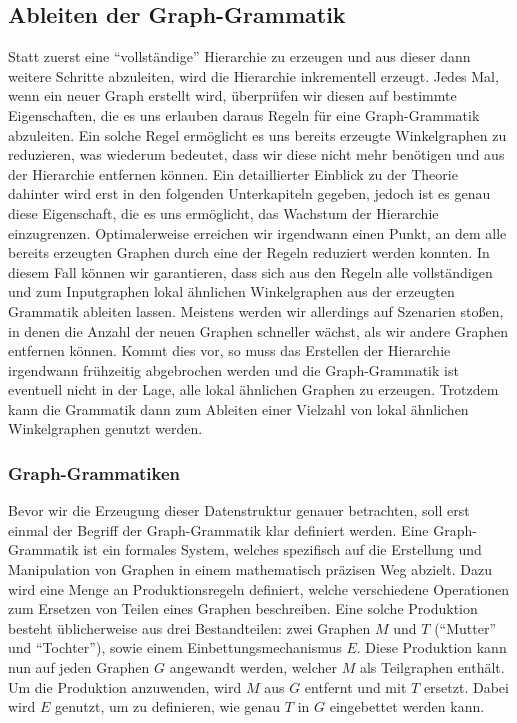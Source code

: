 \subsection{Ableiten der Graph-Grammatik}
Statt zuerst eine ``vollständige'' Hierarchie zu erzeugen und aus
dieser dann weitere Schritte abzuleiten, wird die Hierarchie inkrementell erzeugt. Jedes Mal, wenn ein neuer Graph erstellt wird, überprüfen
wir diesen auf bestimmte Eigenschaften, die es uns erlauben daraus Regeln für eine Graph-Grammatik abzuleiten. Ein solche Regel ermöglicht es
uns bereits erzeugte Winkelgraphen zu reduzieren, was wiederum bedeutet, dass wir diese nicht mehr benötigen und aus der Hierarchie entfernen
können. Ein detaillierter Einblick zu der Theorie dahinter wird erst in den folgenden Unterkapiteln gegeben, jedoch ist es genau diese Eigenschaft,
die es uns ermöglicht, das Wachstum der Hierarchie einzugrenzen. Optimalerweise erreichen wir irgendwann einen Punkt, an dem alle bereits erzeugten
Graphen durch eine der Regeln reduziert werden konnten. In diesem Fall können wir garantieren, dass sich aus den Regeln alle vollständigen
und zum Inputgraphen lokal ähnlichen Winkelgraphen aus der erzeugten Grammatik ableiten lassen. Meistens werden wir allerdings auf
Szenarien stoßen, in denen die Anzahl der neuen Graphen schneller wächst, als wir andere Graphen entfernen können. Kommt dies vor, so muss das
Erstellen der Hierarchie irgendwann frühzeitig abgebrochen werden und die Graph-Grammatik ist eventuell nicht in der Lage, alle lokal ähnlichen
Graphen zu erzeugen. Trotzdem kann die Grammatik dann zum Ableiten einer Vielzahl von lokal ähnlichen Winkelgraphen genutzt werden.

\subsubsection{Graph-Grammatiken}
Bevor wir die Erzeugung dieser Datenstruktur genauer betrachten, soll erst einmal der Begriff der Graph-Grammatik klar definiert werden.
Eine Graph-Grammatik ist ein formales System, welches spezifisch auf die Erstellung und Manipulation von Graphen in einem mathematisch
präzisen Weg abzielt. Dazu wird eine Menge an Produktionsregeln definiert, welche verschiedene Operationen zum Ersetzen von Teilen
eines Graphen beschreiben. Eine solche Produktion besteht üblicherweise aus drei Bestandteilen: zwei Graphen \(M\) und \(T\) (``Mutter'' und
``Tochter''), sowie einem Einbettungsmechanismus \(E\). Diese Produktion kann nun auf jeden Graphen \(G\) angewandt werden, welcher \(M\)
als Teilgraphen enthält. Um die Produktion anzuwenden, wird \(M\) aus \(G\) entfernt und mit \(T\) ersetzt. Dabei wird \(E\) genutzt, um zu
definieren, wie genau \(T\) in \(G\) eingebettet werden kann. \cite{31_engelfriet_rozenberg}

